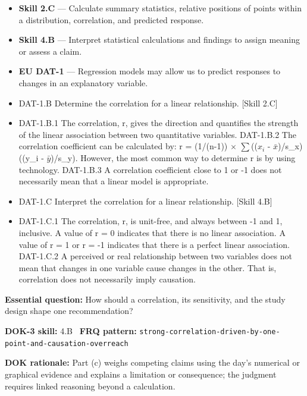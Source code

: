 \documentclass[11pt]{article}
\begin{document}


{\small
\begin{itemize}[leftmargin=1.5em,itemsep=2pt,topsep=2pt]
  \item \textbf{Skill 2.C} --- Calculate summary statistics, relative positions of points within a distribution, correlation, and predicted response.
  \item \textbf{Skill 4.B} --- Interpret statistical calculations and findings to assign meaning or assess a claim.
  \item \textbf{EU DAT-1} --- Regression models may allow us to predict responses to changes in an explanatory variable.
  \item DAT-1.B Determine the correlation for a linear relationship. [Skill 2.C]
  \item DAT-1.B.1 The correlation, r, gives the direction and quantifies the strength of the linear association between two quantitative variables.  DAT-1.B.2 The correlation coefficient can be calculated by: r = (1/(n-1)) $\times$ $\sum$(($x_i$ - $\bar{x}$)/s\_x)((y\_i - $\bar{y}$)/s\_y). However, the most common way to determine r is by using technology.  DAT-1.B.3 A correlation coefficient close to 1 or -1 does not necessarily mean that a linear model is appropriate.
  \item DAT-1.C Interpret the correlation for a linear relationship. [Skill 4.B]
  \item DAT-1.C.1 The correlation, r, is unit-free, and always between -1 and 1, inclusive. A value of r = 0 indicates that there is no linear association. A value of r = 1 or r = -1 indicates that there is a perfect linear association.  DAT-1.C.2 A perceived or real relationship between two variables does not mean that changes in one variable cause changes in the other. That is, correlation does not necessarily imply causation.
\end{itemize}
}
\textbf{Essential question:} How should a correlation, its sensitivity, and the study design shape one recommendation?\par
\textbf{DOK-3 skill:} 4.B \textperiodcentered\ \textbf{FRQ pattern:} {\small\texttt{strong-\allowbreak{}correlation-\allowbreak{}driven-\allowbreak{}by-\allowbreak{}one-\allowbreak{}point-\allowbreak{}and-\allowbreak{}causation-\allowbreak{}overreach}}\par
\textbf{DOK rationale:} Part (c) weighs competing claims using the day's numerical or graphical evidence and explains a limitation or consequence; the judgment requires linked reasoning beyond a calculation.\par
\end{document}
